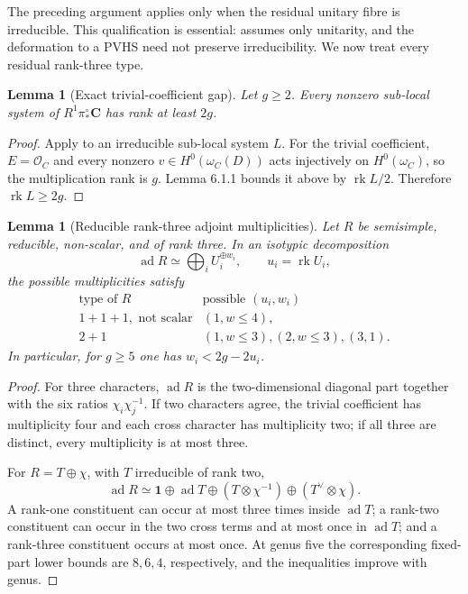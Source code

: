 \documentclass[11pt]{article}
\newtheorem{lemma}[theorem]{Lemma}
\theoremstyle{definition}
\newcommand{\C}{\mathbf C}
\newcommand{\Ocal}{\mathcal O}
\newcommand{\rk}{\operatorname{rk}}
\newcommand{\ad}{\operatorname{ad}}
\begin{document}
The preceding argument applies only when the residual unitary fibre is
irreducible.  This qualification is essential: \cite[Lemma 8.5.1]{LLCan}
assumes only unitarity, and the deformation to a PVHS need not preserve
irreducibility.  We now treat every residual rank-three type.

\begin{lemma}[Exact trivial-coefficient gap]
\label{lem:constant-gap}
Let $g\ge2$.  Every nonzero sub-local system of
$R^1\pi_*^\circ\C$ has rank at least $2g$.
\end{lemma}

\begin{proof}
Apply \cite[Lemma 6.1.1]{LLCan} to an irreducible sub-local system $L$.
For the trivial coefficient, $E=\Ocal_C$ and every nonzero
$v\in H^0(\omega_C(D))$ acts injectively on $H^0(\omega_C)$, so the
multiplication rank is $g$.  Lemma 6.1.1 bounds it above by $\rk L/2$.
Therefore $\rk L\ge2g$.
\end{proof}

\begin{lemma}[Reducible rank-three adjoint multiplicities]
\label{lem:reducible-multiplicity}
Let $R$ be semisimple, reducible, non-scalar, and of rank three.  In an
isotypic decomposition
\[
 \ad R\simeq\bigoplus_i U_i^{\oplus w_i},
 \qquad u_i=\rk U_i,
\]
the possible multiplicities satisfy
\[
\begin{array}{c|c}
\text{type of }R&\text{possible }(u_i,w_i)\\ \hline
1+1+1,\text{ not scalar}&(1,w\le4),\\
2+1&(1,w\le3),(2,w\le3),(3,1).
\end{array}
\]
In particular, for $g\ge5$ one has $w_i<2g-2u_i$.
\end{lemma}

\begin{proof}
For three characters, $\ad R$ is the two-dimensional diagonal part together
with the six ratios $\chi_i\chi_j^{-1}$.  If two characters agree, the
trivial coefficient has multiplicity four and each cross character has
multiplicity two; if all three are distinct, every multiplicity is at most
three.

For $R=T\oplus\chi$, with $T$ irreducible of rank two,
\[
 \ad R\simeq\mathbf1\oplus\ad T
 \oplus(T\otimes\chi^{-1})\oplus(T^\vee\otimes\chi).
\]
A rank-one constituent can occur at most three times inside $\ad T$; a
rank-two constituent can occur in the two cross terms and at most once in
$\ad T$; and a rank-three constituent occurs at most once.  At genus five
the corresponding fixed-part lower bounds are $8,6,4$, respectively, and
the inequalities improve with genus.
\end{proof}
\end{document}
